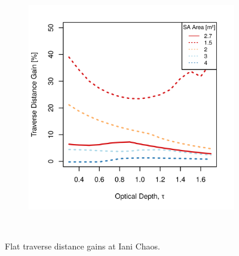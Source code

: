 \begin{figure}[h]
\begin{subfigure}[t]{\subfigureWidth}
        \includegraphics[height=\graphicsHeight]{sections/design/solar-array/plots/ianichaos-75w-traverse-gains-for-different-sa-areas.png}
		\label{fig:plot:sub:iani-chaos-flat-traverse-gains-for-different-sa-area}
	\end{subfigure}\\[0.8ex]
    \caption[Flat traverse distance gains at Iani Chaos]
            {Flat traverse distance gains at Iani Chaos.}
    \label{fig:plot:iani-chaos-flat-traverse-gains}
\vspace{-2ex}
\end{figure}


